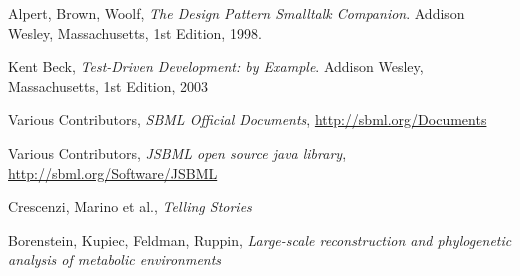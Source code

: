 \begin{thebibliography}{99}

  Alpert, Brown, Woolf,
  \emph{The Design Pattern Smalltalk Companion}.
  Addison Wesley, Massachusetts,
  1st Edition,
  1998.

  Kent Beck,
  \emph{Test-Driven Development: by Example}.
  Addison Wesley, Massachusetts,
  1st Edition,
  2003

  Various Contributors,
  \emph{SBML Official Documents}, \url{http://sbml.org/Documents}

 Various Contributors, \emph{JSBML open
    source java library}, \url{http://sbml.org/Software/JSBML}

  Crescenzi, Marino et al.,
  \emph{Telling Stories}

 Borenstein, Kupiec, Feldman,
  Ruppin, \emph{Large-scale reconstruction and phylogenetic analysis
    of metabolic environments}

\end{thebibliography}